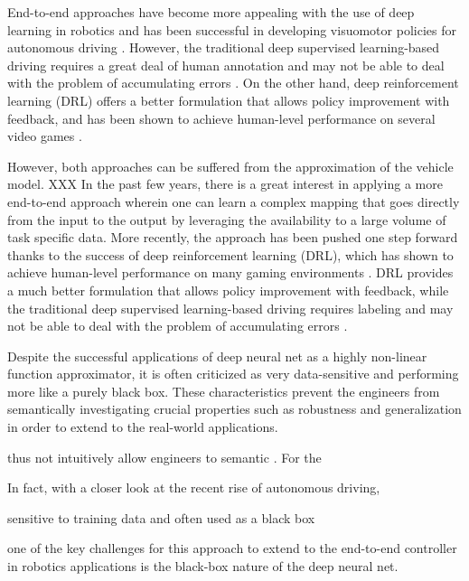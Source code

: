 \documentclass[../thesis.tex]{subfiles}
\begin{document}
End-to-end approaches have become more appealing with the use of deep learning in robotics and has been successful in developing visuomotor policies for autonomous driving \cite{deepdriving,nvidiacar,endtoendcars}. However, the traditional deep supervised learning-based driving requires a great deal of human annotation and may not be able to deal with the problem of accumulating errors \cite{ross2011reduction}. On the other hand, deep reinforcement learning (DRL) offers a better formulation that allows policy improvement with feedback, and has been shown to achieve human-level performance on several video games \cite{mnih2013playing, mnih2015human,2016-TOG-deepRL}.


However, both approaches can be suffered from the approximation of the vehicle model. XXX %
In the past few years, there is a great interest in applying a more end-to-end approach \cite{deepdriving,nvidiacar,endtoendcars} wherein one can learn a complex mapping that goes directly from the input to the output by leveraging the availability to a large volume of task specific data. More recently, the approach has been pushed one step forward thanks to the success of deep reinforcement learning (DRL), which has shown to achieve human-level performance on many gaming environments \cite{mnih2013playing, mnih2015human,2016-TOG-deepRL}. DRL provides a much better formulation that allows policy improvement with feedback, while the traditional deep supervised learning-based driving requires labeling and may not be able to deal with the problem of accumulating errors \cite{ross2011reduction}. 

Despite the successful applications of deep neural net as a highly non-linear function approximator, it is often criticized as very data-sensitive and performing more like a purely black box. These characteristics prevent the engineers from semantically investigating crucial properties such as robustness and generalization in order to extend 
to the real-world applications.


thus not intuitively allow engineers to semantic 
. For the 

In fact, with a closer look at the recent rise of autonomous driving, 

sensitive to training data and often used as a black box 

one of the key challenges for this approach to extend to the end-to-end controller in robotics applications is the black-box nature of the deep neural net.
\end{document}
